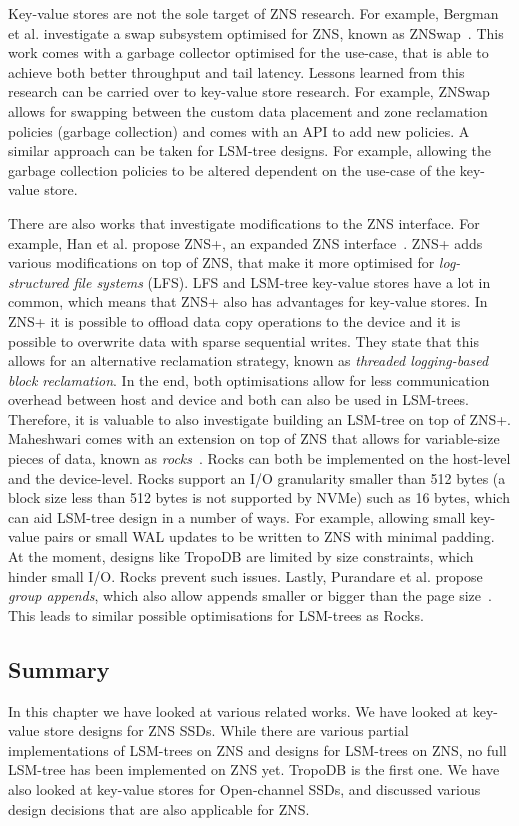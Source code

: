 Key-value stores are not the sole target of ZNS research. For example, Bergman et al. investigate a swap subsystem optimised for ZNS, known as ZNSwap~\cite{bergman2022znswap}. This work comes with a garbage collector optimised for the use-case, that is able to achieve both better throughput and tail latency. Lessons learned from this research can be carried over to key-value store research. For example, ZNSwap allows for swapping between the custom data placement and zone reclamation
policies (garbage collection) and comes with an API to add new policies. A similar approach can be taken for LSM-tree designs. For example, allowing the garbage collection policies to be altered dependent on the use-case of the key-value store.

There are also works that investigate modifications to the ZNS interface. For example, Han et al. propose ZNS+, an expanded ZNS interface~\cite{han2021zns}. ZNS+ adds various modifications on top of ZNS, that make it more optimised for \textit{log-structured file systems} (LFS). LFS and LSM-tree key-value stores have a lot in common, which means that ZNS+ also has advantages for key-value stores. In ZNS+ it is possible to offload data copy operations to the device and it is possible to overwrite data with sparse sequential writes. They state that this allows for an alternative reclamation strategy, known as \textit{threaded logging-based block reclamation}. In the end, both optimisations allow for less communication overhead between host and device and both can also be used in LSM-trees. Therefore, it is valuable to also investigate building an LSM-tree on top of ZNS+. Maheshwari comes with an extension on top of ZNS that allows for variable-size pieces of data, known as \textit{rocks}~\cite{maheshwari2021blocks}. Rocks can both be implemented on the host-level and the device-level. Rocks support an I/O granularity smaller than 512 bytes (a block size less than 512 bytes is not supported by NVMe) such as 16 bytes, which can aid LSM-tree design in a number of ways. For example, allowing small key-value pairs or small WAL updates to be written to ZNS with minimal padding. At the moment, designs like TropoDB are limited by size constraints, which hinder small I/O. Rocks prevent such issues. Lastly, Purandare et al. propose \textit{group appends}, which also allow appends smaller or bigger than the page size~\cite{purandareappend}. This leads to similar possible optimisations for LSM-trees as Rocks.

\subsection{Summary}
In this chapter we have looked at various related works. We have looked at key-value store designs for ZNS SSDs. While there are various partial implementations of LSM-trees on ZNS and designs for LSM-trees on ZNS, no full LSM-tree has been implemented on ZNS yet. TropoDB is the first one. We have also looked at key-value stores for Open-channel SSDs, and discussed various design decisions that are also applicable for ZNS. 

